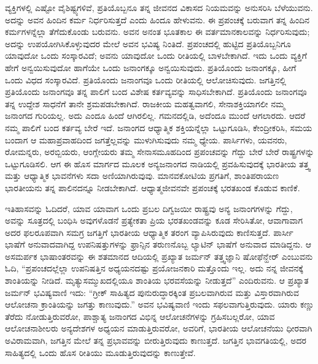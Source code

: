 ವ್ಯಕ್ತಿಗಳಲ್ಲಿ ಎಷ್ಟೋ ವೈಶಿಷ್ಟ್ಯಗಳಿವೆ, ಪ್ರತಿಯೊಬ್ಬನೂ ತನ್ನ ಜೀವನದ ವಿಕಾಸದ ನಿಯಮವನ್ನು ಅನುಸರಿಸಿ ಬೆಳೆಯುವನು. ಅದನ್ನು ಅವನ ಹಿಂದಿನ ಕರ್ಮ ನಿರ್ಧರಿಸು\-ತ್ತದೆ ಎಂದು ಹಿಂದೂ ಹೇಳುವನು. ಈ ಪ್ರಪಂಚಕ್ಕೆ ಬರುವಾಗ ತನ್ನ ಹಿಂದಿನ ಕರ್ಮಗಳನ್ನೆಲ್ಲಾ ತೆಗೆದುಕೊಂಡು ಬರುವನು. ಅವನ ಅನಂತ ಭೂತಕಾಲ ಈ ವರ್ತಮಾನಕಾಲವನ್ನು ನಿರ್ಧರಿಸುವುದು; ಅದನ್ನು ಉಪಯೋಗಿಸಿಕೊಳ್ಳುವುದರ ಮೇಲೆ ಅವನ ಭವಿಷ್ಯ ನಿಂತಿದೆ. ಪ್ರಪಂಚದಲ್ಲಿ ಹುಟ್ಟಿದ ಪ್ರತಿಯೊಬ್ಬನಿಗೂ ಯಾವುದೋ ಒಂದು ಸಂಸ್ಕಾರವಿದೆ; ಅವನು ಯಾವುದೋ ಒಂದು ರೀತಿಯಲ್ಲಿ ಬಾಳಬೇಕಾಗಿದೆ. ಇದು ಒಂದು ವ್ಯಕ್ತಿಗೆ ಹೇಗೆ ಅನ್ವಯಿಸುವುದೋ ಹಾಗೆಯೇ ಒಂದು ಜನಾಂಗಕ್ಕೂ ಅನ್ವಯಿಸುವುದು. ಪ್ರತಿಯೊಂದು ಜನಾಂಗಕ್ಕೂ, ಹೀಗೆ ಒಂದು ವಿಧದ ಸಂಸ್ಕಾರವಿದೆ. ಪ್ರತಿಯೊಂದು ಜನಾಂಗವೂ ಒಂದು ರೀತಿಯಲ್ಲಿ ಆಲೋಚಿಸುವುದು. ಜಗತ್ತಿನಲ್ಲಿ ಪ್ರತಿಯೊಂದು ಜನಾಂಗವೂ ತನ್ನ ಪಾಲಿಗೆ ಬಂದ ವಿಶೇಷ ಕರ್ತವ್ಯವನ್ನು ಸಾಧಿಸಬೇಕಾಗಿದೆ. ಪ್ರತಿಯೊಂದು ಜನಾಂಗವೂ ತನ್ನ ಉದ್ದೇಶ ಸಾಧನೆಗೆ ತಾನೇ ಶ್ರಮಪಡಬೇಕಾಗಿದೆ. ರಾಜಕೀಯ ಮಹತ್ವವಾಗಲಿ, ಸೇನಾಶಕ್ತಿಯಾಗಲೀ ನಮ್ಮ ಜನಾಂಗದ ಗುರಿಯಲ್ಲ. ಅದು ಎಂದೂ ಹಿಂದೆ ಆಗಿರಲಿಲ್ಲ. ಗಮನದಲ್ಲಿಡಿ, ಅದೆಂದೂ ಮುಂದೆ ಆಗಲಾರದು. ಆದರೆ ನಮ್ಮ ಪಾಲಿಗೆ ಬಂದ ಕರ್ತವ್ಯ ಬೇರೆ ಇದೆ. ಜನಾಂಗದ ಆಧ್ಯಾತ್ಮಿಕ ಶಕ್ತಿಯನ್ನೆಲ್ಲಾ ಒಟ್ಟುಗೂಡಿಸಿ, ಕೇಂದ್ರೀಕರಿಸಿ, ಸಮಯ ಬಂದಾಗ ಆ ಮಹಾಪ್ರವಾಹದಿಂದ ಜಗತ್ತೆಲ್ಲವನ್ನು ಮುಳುಗಿಸುವುದು ನಮ್ಮ ಧ್ಯೇಯ. ಪಾರ್ಸಿಗಳು, ಯವನರು, ರೋಮನ್ನರು, ಅರಬ್ಬಿಯರು, ಆಂಗ್ಲೇಯರು ತಮ್ಮ ಸೇನಾಸಮೂಹದಿಂದ ಪ್ರಪಂಚವನ್ನು ಗೆದ್ದು ಬೇರೆ ಬೇರೆ ರಾಷ್ಟ್ರಗಳನ್ನು ಒಟ್ಟುಗೂಡಿಸಲಿ. ಆಗ ಈ ಹೊಸ ಮಾರ್ಗದ ಮೂಲಕ ಅನ್ಯಜನಾಂಗದ ನಾಡಿಯಲ್ಲಿ ಪ್ರವಹಿಸುವುದಕ್ಕೆ ಭಾರತೀಯ ತತ್ತ್ವ ಮತ್ತು ಆಧ್ಯಾತ್ಮಿಕ ಭಾವನೆಗಳು ಸದಾ ಅಣಿಯಾಗಿರುವುವು. ಮಾನವಕೋಟಿಯ ಪ್ರಗತಿಗೆ, ಶಾಂತಿಪರಾಯಣ ಭಾರತೀಯನು ತನ್ನ ಪಾಲಿನದನ್ನೂ ನೀಡಬೇಕಾಗಿದೆ. ಆಧ್ಯಾತ್ಮಜೀವನವೇ ಪ್ರಪಂಚಕ್ಕೆ ಭರತಖಂಡ ಕೊಡುವ ಕಾಣಿಕೆ.

ಇತಿಹಾಸವನ್ನು ಓದಿದರೆ, ಯಾವ ಯಾವಾಗ ಒಂದು ಪ್ರಬಲ ದಿಗ್ವಜಯೀ ರಾಷ್ಟ್ರವು ಅನ್ಯ ಜನಾಂಗಗಳನ್ನು ಗೆದ್ದು, ಅವನ್ನು ಸೂತ್ರದಲ್ಲಿ ಬಂಧಿಸಿ ಅವುಗಳೊಡನೆ ಪ್ರತ್ಯೇಕತಾ ಪ್ರಿಯ ಭರತಖಂಡವನ್ನು ಕೂಡ ಸೇರಿಸಿತೋ, ಆವಾಗಾವಾಗ ಅದರ ಫಲರೂಪವಾಗಿ ಸಮಗ್ರ ಜಗತ್ತಿಗೆ ಭಾರತೀಯ ಆಧ್ಯಾತ್ಮಿಕ ತರಂಗ ವ್ಯಾಪಿಸಿರುವುದು ಕಾಣಿಸುತ್ತದೆ. ಪಾರ್ಸೀ ಭಾಷೆಗೆ ಅನುವಾದವಾಗಿದ್ದ ಉಪನಿಷತ್ತುಗಳನ್ನು ಫ್ರಾನ್ಸಿನ ತರುಣನೊಬ್ಬ ಲ್ಯಾಟಿನ್​ ಭಾಷೆಗೆ ಅನುವಾದ ಮಾಡಿದ್ದನು. ಆ ಅಸಮರ್ಪಕ ಭಾಷಾಂತರವನ್ನು ಈ ಶತಮಾನದ ಆದಿಯಲ್ಲಿ ಪ್ರಖ್ಯಾತ ಜರ್ಮನ್​ ತತ್ತ್ವಜ್ಞಾನಿ ಷೋಫೆನ್ಹೇರ್​ ಎಂಬುವನು ಓದಿ, “ಪ್ರಪಂಚದಲ್ಲೆಲ್ಲಾ ಉಪನಿಷತ್ತಿನ ಅಧ್ಯಯನದಷ್ಟು ಪ್ರಯೋಜನಕಾರಿ ಮತ್ತೊಂದು ಇಲ್ಲ. ಅದು ನನ್ನ ಜೀವನಕ್ಕೆ ಶಾಂತಿಯನ್ನು ನೀಡಿದೆ. ಮೃತ್ಯುಸಮ್ಮುಖದಲ್ಲಿಯೂ ಶಾಂತಿಯ ಭರವಸೆಯನ್ನು ನೀಡುತ್ತದೆ” ಎಂದಿರುವನು. ಆ ಪ್ರಖ್ಯಾತ ಜರ್ಮನ್​ ಭವಿಷ್ಯವಾಣಿ ಇದು: “ಗ್ರೀಕ್​ ಸಾಹಿತ್ಯದ ಪುನುರುದ್ಧಾರಕ್ಕಿಂತ ಪ್ರಬಲವಾಗಿರುವ ಮತ್ತು ವಿಸ್ತಾರವಾಗಿರುವ ಆಲೋಚನಾ ಕ್ರಾಂತಿಯನ್ನು ಜಗತ್ತು ಕಾಣುವುದು.” ಅವನ ಭವಿಷ್ಯವಾಣಿ ಇಂದು ಸಫಲವಾಗುತ್ತಿರುವುದು. ಯಾರು ಕಣ್ಣು ತೆರೆದು ನೋಡುತ್ತಿರುವರೋ, ಪಾಶ್ಚಾತ್ಯ ಜನಾಂಗದ ವಿಭಿನ್ನ ಆಲೋಚನೆ\-ಗಳನ್ನು ಗ್ರಹಿಸಬಲ್ಲರೋ, ಯಾವ ಆಲೋಚನಾಶೀಲರು ಅನ್ಯದೇಶಗಳ ಅಧ್ಯಯನ ಮಾಡುತ್ತಿರುವರೋ, ಅವರಿಗೆ, ಭಾರತೀಯ ಆಲೋಚನೆಯು ಧೀರವಾಗಿ ಅವಿರಾಮವಾಗಿ, ಜಗತ್ತಿನ ಮೇಲೆ ತನ್ನ ಪ್ರಭಾವವನ್ನು ಬೀರುತ್ತಿರುವುದು ಕಾಣುತ್ತದೆ. ಜಗತ್ತಿನ ಭಾವಗತಿಯಲ್ಲಿ, ಅದರ ಸಾಹಿತ್ಯದಲ್ಲಿ ಒಂದು ಹೊಸ ರೀತಿಯು ಮೂಡುತ್ತಿರುವುದನ್ನು ಕಾಣುತ್ತೇವೆ.

